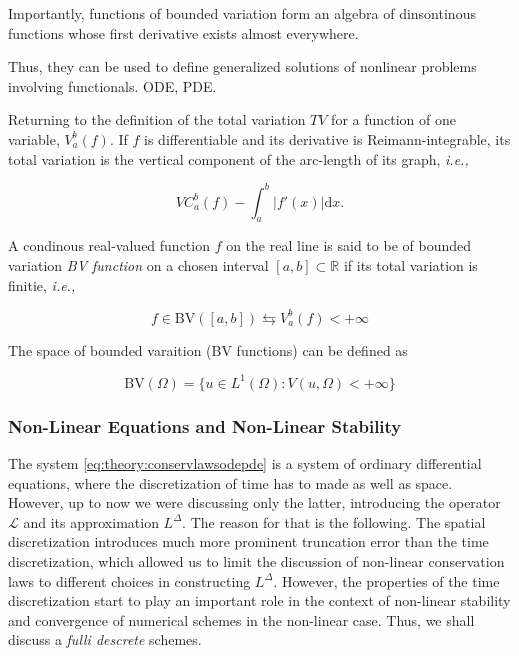 Importantly, functions of bounded variation form an algebra of dinsontinous functions whose first derivative exists almost everywhere. 

Thus, they can be used to define generalized solutions of nonlinear problems involving functionals. ODE, PDE.

Returning to the definition of the total variation $TV$ for a function of one variable, $V_a ^b (f)$. 
If $f$ is differentiable and its derivative is Reimann-integrable, its total variation is the vertical component of the arc-length of its graph, \textit{i.e.,}

\begin{equation}
VC_a ^b(f) - \int_a ^b |f'(x)|\text{d}x.
\end{equation}

A condinous real-valued function $f$ on the real line is said to be of bounded variation \textit{BV function} on a chosen interval $[a, b]\subset \mathbb{R}$ if its total variation is finitie, \textit{i.e.,}

\begin{equation}
f\in\text{BV}([a,b]) \leftrightarrows V_a ^b (f) < +\infty
\end{equation}

The space of bounded varaition (BV functions) can be defined as 

\begin{equation}
\text{BV}(\Omega) = \{u\in L^1(\Omega): V(u, \Omega) < +\infty\}
\end{equation}


\subsubsection{Non-Linear Equations and Non-Linear Stability}


The system \ref{eq:theory:conservlawsodepde} is a system of ordinary differential equations, where the discretization of time has to made as well as space. 
However, up to now we were discussing only the latter, introducing the operator $\mathcal{L}$ and its approximation $L^{\Delta}$. 
The reason for that is the following. The spatial discretization introduces much more prominent truncation error than the time discretization, which allowed us to limit the discussion of non-linear conservation laws to different choices in constructing $L^{\Delta}$. 
However, the properties of the time discretization start to play an important role in the context of non-linear stability and convergence of numerical schemes in the non-linear case. 
Thus, we shall discuss a \textit{fulli descrete} schemes.

